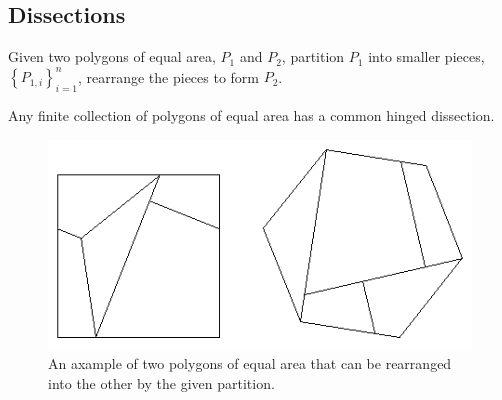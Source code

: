 \subsection{Dissections}
\begin{prob}\label{def:dissection}
Given two polygons of equal area, $P_1$ and $P_2$, partition $P_1$ into smaller
pieces,$\left\lbrace P_{1,i}\right\rbrace_{i=1}^n $, rearrange the pieces to
form $P_2$. \cite{frederickson1997dissections}
\end{prob}
\begin{thm}[]\label{thm}
Any finite collection of polygons of equal area has a common hinged dissection.
\cite{abbott2012hinged}
\end{thm}
\begin{figure}[h]
\begin{center}
\includegraphics[scale=.3]{graphics/polygonaldissection.png}
\caption{An axample of two polygons of equal area that can be rearranged into
the other by the given partition.\cite{davidEppstienJunkyard}}
\label{fig:polygonaldissection}
\end{center}
\end{figure}